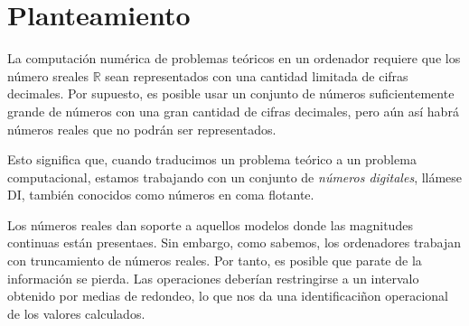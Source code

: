 \section{Planteamiento}

La computación numérica de problemas teóricos en un ordenador requiere que los número sreales $\mathbb{R}$ sean representados con una cantidad limitada de cifras decimales. Por supuesto, es posible usar un conjunto de números suficientemente grande de números con una gran cantidad de cifras decimales, pero aún así habrá números reales que no podrán ser representados.
\par Esto significa que, cuando traducimos un problema teórico a un problema computacional, estamos trabajando con un conjunto de{ \em números digitales}, llámese DI, también conocidos como números en coma flotante.
\par Los números reales dan soporte a aquellos modelos donde las magnitudes continuas están presentaes. Sin embargo, como sabemos, los ordenadores trabajan con truncamiento de números reales. Por tanto, es posible que parate de la información se pierda. Las operaciones deberían restringirse a un intervalo obtenido por medias de redondeo, lo que nos da una identificaciñon operacional de los valores calculados.